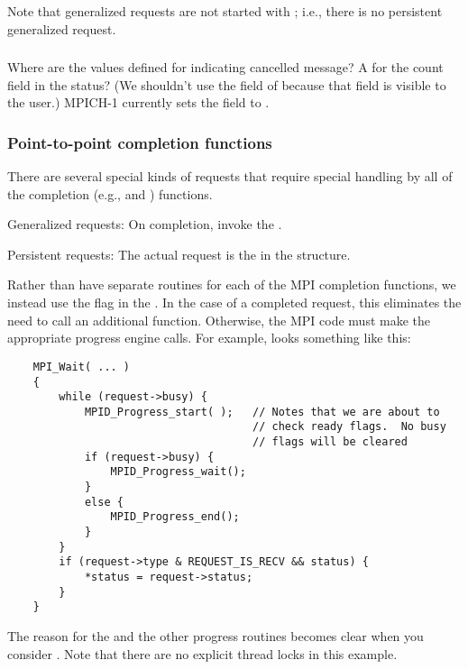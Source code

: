 \documentclass{article}
\begin{document}
Note that generalized requests are not started with ; i.e.,
there is no persistent generalized request.

\subsubsection{}
Where are the values defined for indicating cancelled message?
A  for the count field in the
status?
(We shouldn't use the  field of
 because that field is visible to the user.)
MPICH-1 currently sets the  field to .

\subsubsection{Point-to-point completion functions}
There are several special kinds of requests that require special handling by
all of the completion (e.g.,  and )
functions. 

Generalized requests:  On completion, invoke the
. 

Persistent requests: The actual request is the
 in the
 structure.

Rather than have separate routines for each of the MPI completion
functions, we instead use the  flag in the
.  In the case of a completed request, this
eliminates the need to call an additional function.  Otherwise, the
MPI code must make the appropriate progress engine calls.  For
example,  looks something like this:
\begin{verbatim}
    MPI_Wait( ... )
    {
        while (request->busy) {
            MPID_Progress_start( );   // Notes that we are about to
                                      // check ready flags.  No busy 
                                      // flags will be cleared
            if (request->busy) {
                MPID_Progress_wait();
            }
            else {
                MPID_Progress_end();
            }
        }
        if (request->type & REQUEST_IS_RECV && status) {
            *status = request->status;
        }
    }
\end{verbatim}
The reason for the  and the other
progress routines becomes clear when you consider
.
Note that there are no explicit thread locks in this example.  
\end{document}
